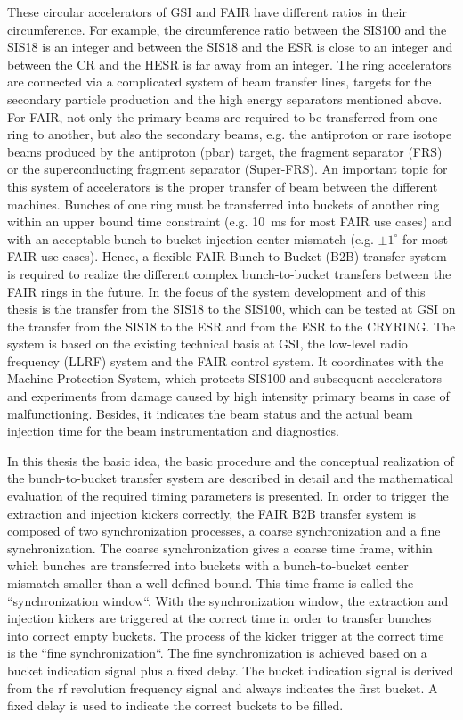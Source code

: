 These circular accelerators of GSI and FAIR have different ratios in their circumference. For example, the circumference ratio between the SIS100 and the SIS18 is an integer and between the SIS18 and the ESR is close to an integer and between the CR and the HESR is far away from an integer. The ring accelerators are connected via a complicated system of beam transfer lines, targets for the secondary particle production and the high energy separators mentioned above. For FAIR, not only the primary beams are required to be transferred from one ring to another, but also the secondary beams, e.g. the antiproton or rare isotope beams produced by the antiproton (pbar) target, the fragment separator (FRS) or the superconducting fragment separator (Super-FRS). An important topic for this system of accelerators is the proper transfer of beam between the different machines. Bunches of one ring must be transferred into buckets of another ring within an upper bound time constraint (e.g. \SI{10}{\ms} for most FAIR use cases) and with an acceptable bunch-to-bucket injection center mismatch (e.g. $\pm1^\circ$ for most FAIR use cases). Hence, a flexible FAIR Bunch-to-Bucket (B2B) transfer system is required to realize the different complex bunch-to-bucket transfers between the FAIR rings in the future. In the focus of the system development and of this thesis is the transfer from the SIS18 to the SIS100, which can be tested at GSI on the transfer from the SIS18 to the ESR and from the ESR to the CRYRING. The system is based on the existing technical basis at GSI, the low-level radio frequency (LLRF) system and the FAIR control system. It coordinates with the Machine Protection System, which protects SIS100 and subsequent accelerators and experiments from damage caused by high intensity primary beams in case of malfunctioning. Besides, it indicates the beam status and the actual beam injection time for the beam instrumentation and diagnostics. 

In this thesis the basic idea, the basic procedure and the conceptual realization of the bunch-to-bucket transfer system are described in detail and the mathematical evaluation of the required timing parameters is presented. In order to trigger the extraction and injection kickers correctly, the FAIR B2B transfer system is composed of two synchronization processes, a coarse synchronization and a fine synchronization. The coarse synchronization gives a coarse time frame, within which bunches are transferred into buckets with a bunch-to-bucket center mismatch smaller than a well defined bound. This time frame is called the ``synchronization window``. With the synchronization window, the extraction and injection kickers are triggered at the correct time in order to transfer bunches into correct empty buckets. The process of the kicker trigger at the correct time is the ``fine synchronization``. The fine synchronization is achieved based on a bucket indication signal plus a fixed delay. The bucket indication signal is derived from the rf revolution frequency signal and always indicates the first bucket. A fixed delay is used to indicate the correct buckets to be filled.

